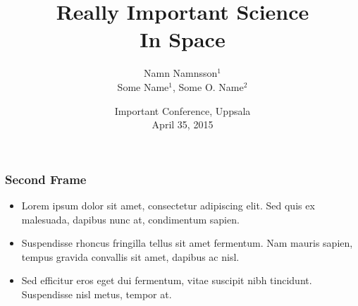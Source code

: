 \documentclass{beamer}
\title{Really Important Science\\ In Space}
\author{Namn Namnsson$^{1}$\\
Some Name$^{1}$, Some O. Name$^{2}$ 
}
\institute[Universities Here and There] %
{
\inst{1}%
Institute of Space Lasers, University A

\inst{2}
Institute of Dinosaurs in Space, University B
}
\date{Important Conference, Uppsala\\ April 35, 2015}
\begin{document}
\begin{frame}
\titlepage
\end{frame}


\begin{frame}
\frametitle{Second Frame}
\begin{itemize}
\item Lorem ipsum dolor sit amet, consectetur adipiscing elit. Sed quis ex malesuada, dapibus nunc at, condimentum sapien. 
\item Suspendisse rhoncus fringilla tellus sit amet fermentum. Nam mauris sapien, tempus gravida convallis sit amet, dapibus ac nisl.
\item  Sed efficitur eros eget dui fermentum, vitae suscipit nibh tincidunt. Suspendisse nisl metus, tempor at.
\end{itemize}

\end{frame}
\end{document}
